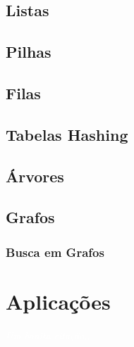 \documentclass[11pt,fleqn]{book} %
\begin{document}
\section{Listas}\label{listas}

\section{Pilhas}\label{pilhas}

\section{Filas}\label{filas}

\section{Tabelas Hashing}\label{hashing}

\section{Árvores}\label{arvores}

\section{Grafos}\label{grafos}

\subsection{Busca em Grafos}

\chapter{Aplicações}\label{aplicacoes}
\vspace{6em}
\begin{flushright}
	\textit{\textcolor{white}{Um bonita citação...}}
\end{flushright}
\vspace{12em}



%
\end{document}
